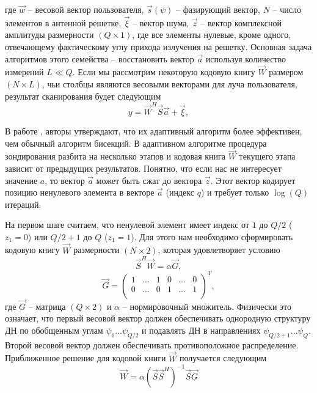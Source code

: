 где $\vec w$ -- весовой вектор пользователя,
$\vec s(\psi)$ -- фазирующий вектор,
$N$ -- число элементов в антенной решетке,
$\vec \xi$ -- вектор шума,
$\vec z$ -- вектор комплексной амплитуды размерности $(Q\times 1)$,
где все элементы нулевые, кроме одного, отвечающему фактическому углу
прихода излучения на решетку.
Основная задача алгоритмов этого семейства -- восстановить вектор $\vec a$
используя количество измерений $L \ll Q$.  Если мы рассмотрим некоторую кодовую
книгу $\vec W$ размером $(N \times L)$, чьи столбцы являются весовыми векторами
для луча пользователя, результат сканирования будет
следующим
\begin{equation}
    \label{eq:4.46}
    y = \vec W^H\vec S \vec a + \vec \xi,
\end{equation}

В работе \cite{Alkhateeb2014}, авторы утверждают, что их адаптивный алгоритм более эффективен,
чем обычный алгоритм бисекций. В адаптивном алгоритме процедура зондирования разбита на несколько этапов
и кодовая книга $\vec W$ текущего этапа зависит от предыдущих результатов. Понятно, что если нас не интересует значение $a$, то
вектор $\vec a$ может быть сжат до вектора $\vec z$. Этот вектор кодирует позицию ненулевого элемента в векторе $\vec a$ (индекс $q$) и
требует только $\log(Q)$ итераций.

На первом шаге считаем, что ненулевой элемент имеет индекс от $1$ до $Q/2$ ($z_1=0$) или
$Q/2+1$ до $Q$ ($z_1=1$). Для этого нам необходимо сформировать кодовую книгу $\vec W$ размерности $(N \times 2)$, которая удовлетворяет условию
\begin{equation}
    \label{eq:4.47}
    \vec S^H \vec W = \alpha \vec G,
\end{equation}
\begin{equation}
    \label{eq:4.48}
    \vec G =
    \begin{pmatrix}
        1 & \dots & 1 & 0 & \dots & 0 \\
        0 & \dots & 0 & 1 & \dots & 1 \\
    \end{pmatrix}^T,
\end{equation}
где $\vec G$ -- матрица $(Q \times 2)$ и $\alpha$ -- нормировочный множитель.
Физически это означает, что первый весовой вектор должен обеспечивать однородную структуру ДН по
обобщенным углам $\psi_1 \dots \psi_{Q/2}$ и подавлять ДН в направлениях $\psi_{Q/2 + 1}\dots \psi_Q$. Второй весовой вектор должен обеспечивать противоположное распределение.
Приближенное решение для кодовой книги $\vec W$ получается следующим
\begin{equation}
    \label{eq:4.49}
    \vec W = \alpha (\vec S \vec S^H)^{-1} \vec S \vec G
\end{equation}

